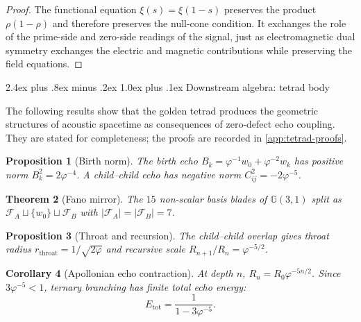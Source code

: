 \documentclass[11pt,a4paper]{article}
\makeatletter
\theoremstyle{plain}
\newtheorem{theorem}{Theorem}[section]
\newtheorem{proposition}[theorem]{Proposition}
\newtheorem{corollary}[theorem]{Corollary}
\theoremstyle{definition}
\theoremstyle{remark}
\numberwithin{equation}{section}
\newcommand{\Cl}{\mathbb{G}}
\newcommand{\vp}{\varphi}
\renewcommand{\subsection}{%
  \@startsection{subsection}{2}{0pt}%
    {2.4ex plus .8ex minus .2ex}%
    {1.0ex plus .1ex}%
    {\normalfont\Large\bfseries\color{headingAccent}}%
}
\makeatother
\begin{document}
\begin{proof}
The functional equation \(\xi(s)=\xi(1-s)\) preserves the product
\(\rho(1-\rho)\) and therefore preserves the null-cone condition.
It exchanges the role of the prime-side and zero-side readings of the
signal, just as electromagnetic dual symmetry exchanges the electric and
magnetic contributions while preserving the field equations.
\end{proof}

\subsection{Downstream algebra: tetrad body}

The following results show that the golden tetrad produces the geometric
structures of acoustic spacetime as consequences of zero-defect echo
coupling.  They are stated for completeness; the proofs are recorded in
\cref{app:tetrad-proofs}.

\begin{proposition}[Birth norm]
\label{prop:birth}
The birth echo \(B_k=\vp^{-1}w_0+\vp^{-2}w_k\) has positive norm
\(B_k^2=2\vp^{-4}\).  A child--child echo has negative norm
\(C_{ij}^2=-2\vp^{-5}\).
\end{proposition}

\begin{theorem}[Fano mirror]
\label{thm:fano-mirror}
The \(15\) non-scalar basis blades of \(\Cl(3,1)\) split as
\(\mathcal F_A\sqcup\{w_0\}\sqcup\mathcal F_B\) with
\(|\mathcal F_A|=|\mathcal F_B|=7\).
\end{theorem}

\begin{proposition}[Throat and recursion]
\label{prop:throat}
The child--child overlap gives throat radius
\(r_{\mathrm{throat}}=1/\sqrt{2\vp}\) and recursive scale
\(R_{n+1}/R_n=\vp^{-5/2}\).
\end{proposition}

\begin{corollary}[Apollonian echo contraction]
\label{cor:apollonian-contraction}
At depth \(n\), \(R_n=R_0\vp^{-5n/2}\).  Since \(3\vp^{-5}<1\),
ternary branching has finite total echo energy:
\[
  E_{\mathrm{tot}}=\frac1{1-3\vp^{-5}}.
\]
\end{corollary}
\end{document}
